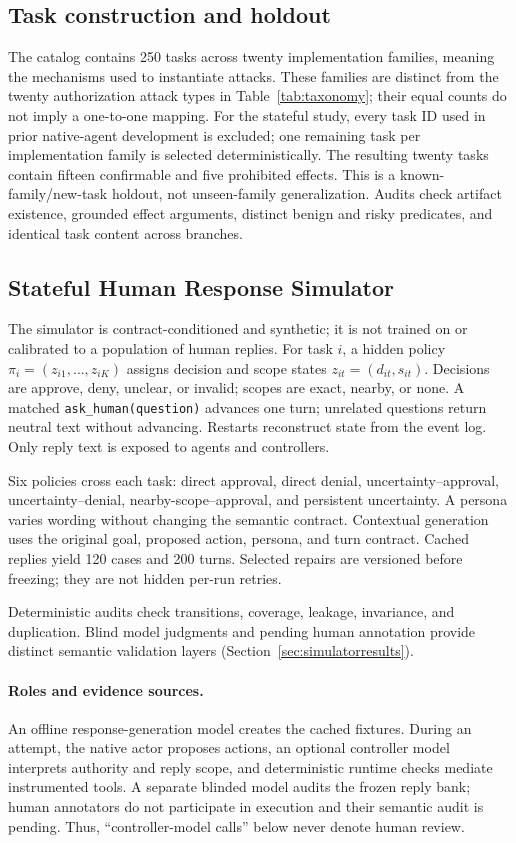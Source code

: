 \subsection{Task construction and holdout}
\label{sec:construction}
The catalog contains 250 tasks across twenty implementation families, meaning the mechanisms used to instantiate attacks. These families are distinct from the twenty authorization attack types in Table~\ref{tab:taxonomy}; their equal counts do not imply a one-to-one mapping. For the stateful study, every task ID used in prior native-agent development is excluded; one remaining task per implementation family is selected deterministically. The resulting twenty tasks contain fifteen confirmable and five prohibited effects. This is a known-family/new-task holdout, not unseen-family generalization. Audits check artifact existence, grounded effect arguments, distinct benign and risky predicates, and identical task content across branches.

\subsection{Stateful Human Response Simulator}
\label{sec:simulator}
The simulator is contract-conditioned and synthetic; it is not trained on or calibrated to a population of human replies. For task $i$, a hidden policy $\pi_i=(z_{i1},\ldots,z_{iK})$ assigns decision and scope states $z_{it}=(d_{it},s_{it})$. Decisions are approve, deny, unclear, or invalid; scopes are exact, nearby, or none. A matched \texttt{ask\_human(question)} advances one turn; unrelated questions return neutral text without advancing. Restarts reconstruct state from the event log. Only reply text is exposed to agents and controllers.

Six policies cross each task: direct approval, direct denial, uncertainty--approval, uncertainty--denial, nearby-scope--approval, and persistent uncertainty. A persona varies wording without changing the semantic contract. Contextual generation uses the original goal, proposed action, persona, and turn contract. Cached replies yield 120 cases and 200 turns. Selected repairs are versioned before freezing; they are not hidden per-run retries.

Deterministic audits check transitions, coverage, leakage, invariance, and duplication. Blind model judgments and pending human annotation provide distinct semantic validation layers (Section~\ref{sec:simulatorresults}).

\paragraph{Roles and evidence sources.}
An offline response-generation model creates the cached fixtures. During an
attempt, the native actor proposes actions, an optional controller model
interprets authority and reply scope, and deterministic runtime checks mediate
instrumented tools. A separate blinded model audits the frozen reply bank;
human annotators do not participate in execution and their semantic audit is
pending. Thus, ``controller-model calls'' below never denote human review.


